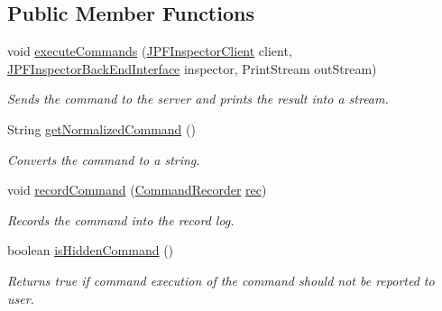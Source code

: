 \subsection*{Public Member Functions}
\begin{DoxyCompactItemize}
\item 
void \hyperlink{classgov_1_1nasa_1_1jpf_1_1inspector_1_1client_1_1commands_1_1_cmd_breakpoint_show_a757660b75363fbf8f7c7b198fe83f1e3}{execute\+Commands} (\hyperlink{classgov_1_1nasa_1_1jpf_1_1inspector_1_1client_1_1_j_p_f_inspector_client}{J\+P\+F\+Inspector\+Client} client, \hyperlink{interfacegov_1_1nasa_1_1jpf_1_1inspector_1_1interfaces_1_1_j_p_f_inspector_back_end_interface}{J\+P\+F\+Inspector\+Back\+End\+Interface} inspector, Print\+Stream out\+Stream)
\begin{DoxyCompactList}\small\item\em Sends the command to the server and prints the result into a stream. \end{DoxyCompactList}\item 
String \hyperlink{classgov_1_1nasa_1_1jpf_1_1inspector_1_1client_1_1commands_1_1_cmd_breakpoint_show_a44bd72fe9748cbe3822502ab0fcbcc63}{get\+Normalized\+Command} ()
\begin{DoxyCompactList}\small\item\em Converts the command to a string. \end{DoxyCompactList}\item 
void \hyperlink{classgov_1_1nasa_1_1jpf_1_1inspector_1_1client_1_1_client_command_ae0670332ec750bc5b9016d0b04d8adfe}{record\+Command} (\hyperlink{classgov_1_1nasa_1_1jpf_1_1inspector_1_1client_1_1_command_recorder}{Command\+Recorder} \hyperlink{classgov_1_1nasa_1_1jpf_1_1inspector_1_1client_1_1_client_command_af4246f2427035c72a6af45a2c61361f7}{rec})
\begin{DoxyCompactList}\small\item\em Records the command into the record log. \end{DoxyCompactList}\item 
boolean \hyperlink{classgov_1_1nasa_1_1jpf_1_1inspector_1_1client_1_1_client_command_afb09c400c64e2d8e01059b91ff847761}{is\+Hidden\+Command} ()
\begin{DoxyCompactList}\small\item\em Returns true if command execution of the command should not be reported to user. \end{DoxyCompactList}\end{DoxyCompactItemize}

